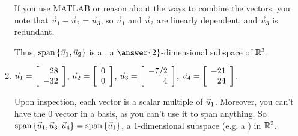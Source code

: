 \documentclass{ximera}
\begin{document}
\begin{example}
\begin{enumerate}
    \begin{solution}
    
      If you use MATLAB or reason about the ways to combine the vectors, you note that $\vec{u}_1-\vec{u}_2=\vec{u}_3$, so $\vec{u}_1$ and $\vec{u}_2$ are linearly dependent, and $\vec{u}_3$ is redundant.
      
      Thus, $\sspan\set{\vect{u}_1,\vect{u}_2}$ is a , a $\answer{2}$-dimensional subspace of $\R^3$.

    \end{solution}

    \item $\vect{u}_1=\startmat{r} 28 \\ -32 \stopmat$, $\vect{u}_2=\startmat{r} 0 \\ 0 \stopmat$, $\vect{u}_3=\startmat{r} -7/2 \\ 4 \stopmat$, $\vect{u}_4=\startmat{r} -21 \\ 24 \stopmat$.
    
    \begin{solution}
    
      Upon inspection, each vector is a scalar multiple of $\vect{u}_1$. Moreover, you can't have the $0$ vector in a basis, as you can't use it to span anything. So $\sspan\set{\vect{u}_1, \vect{u}_3, \vect{u}_4}=\sspan\set{\vect{u}_1}$, a $1$-dimensional subspace (e.g. a ) in $\R^2$.

    \end{solution}
    
  \end{enumerate}

\end{example}
\end{document}
